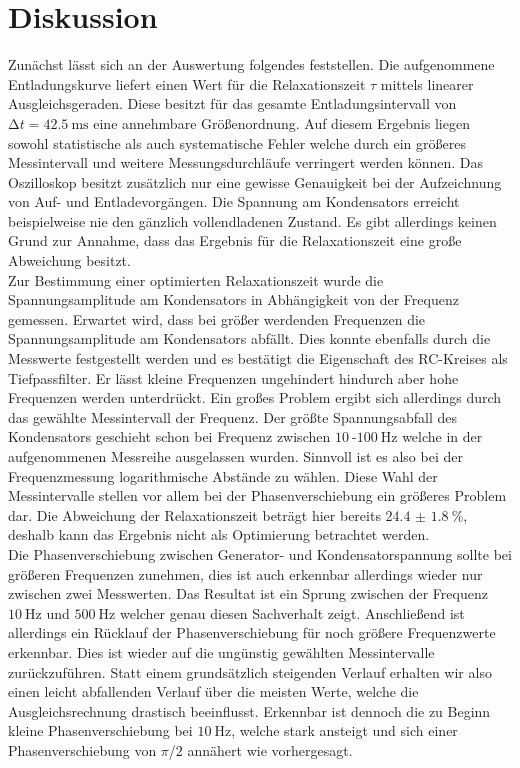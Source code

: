 \section{Diskussion}

Zunächst lässt sich an der Auswertung folgendes feststellen. Die aufgenommene Entladungskurve liefert einen Wert für die 
Relaxationszeit $\tau$ mittels linearer Ausgleichsgeraden. Diese besitzt für das gesamte Entladungsintervall von $\increment t = \SI{42.5}{\milli\second}$ eine annehmbare
Größenordnung. Auf diesem Ergebnis liegen sowohl statistische als auch systematische Fehler welche durch ein größeres Messintervall und weitere Messungsdurchläufe verringert werden 
können. Das Oszilloskop besitzt zusätzlich nur eine gewisse Genauigkeit bei der Aufzeichnung von Auf- und Entladevorgängen. Die Spannung am Kondensators erreicht beispielweise 
nie den gänzlich vollendladenen Zustand.
Es gibt allerdings keinen Grund zur Annahme, dass das Ergebnis für die Relaxationszeit eine große Abweichung besitzt.
\\
\newline
Zur Bestimmung einer optimierten Relaxationszeit wurde die Spannungsamplitude am Kondensators in Abhängigkeit von der Frequenz gemessen. 
Erwartet wird, dass bei größer werdenden Frequenzen die Spannungsamplitude am Kondensators abfällt.
Dies konnte ebenfalls durch die Messwerte festgestellt werden und es bestätigt die Eigenschaft des 
RC-Kreises als Tiefpassfilter. Er lässt kleine Frequenzen ungehindert hindurch aber hohe Frequenzen werden unterdrückt.
Ein großes Problem ergibt sich allerdings durch das gewählte Messintervall der Frequenz.
Der größte Spannungsabfall des Kondensators geschieht schon bei Frequenz zwischen $\SI{10}{}$-$\SI{100}{\hertz}$ welche in der aufgenommenen Messreihe ausgelassen wurden.
Sinnvoll ist es also bei der Frequenzmessung logarithmische Abstände zu wählen. Diese Wahl der Messintervalle stellen vor allem bei der Phasenverschiebung ein größeres Problem dar.
Die Abweichung der Relaxationszeit beträgt hier bereits $\SI{24.4(18)}{\percent}$, deshalb kann das Ergebnis nicht als Optimierung betrachtet werden.
\\
\newline
Die Phasenverschiebung zwischen Generator- und Kondensatorspannung sollte bei größeren Frequenzen zunehmen, dies ist auch erkennbar allerdings
wieder nur zwischen zwei Messwerten.
Das Resultat ist ein Sprung zwischen der Frequenz $\SI{10}{\hertz}$ 
und $\SI{500}{\hertz}$ welcher genau diesen Sachverhalt zeigt. Anschließend ist allerdings ein Rücklauf der Phasenverschiebung für noch größere Frequenzwerte erkennbar.
Dies ist wieder auf die ungünstig gewählten Messintervalle zurückzuführen. Statt einem grundsätzlich steigenden Verlauf erhalten wir also einen leicht abfallenden Verlauf über die meisten Werte, welche die 
Ausgleichsrechnung drastisch beeinflusst. Erkennbar ist dennoch die zu Beginn kleine Phasenverschiebung bei $\SI{10}{\hertz}$, welche stark ansteigt und sich einer
Phasenverschiebung von $\pi$/$2$ annähert wie vorhergesagt.
